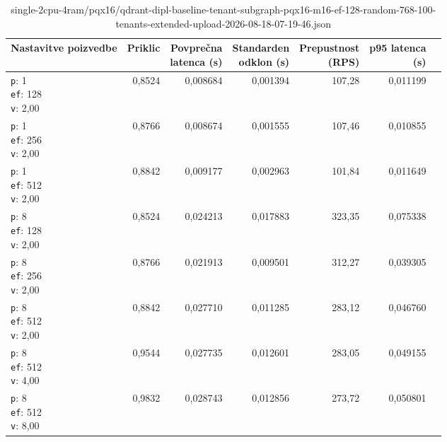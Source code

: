 \begin{table}[htbp]
  \centering
\small
  \caption{single-2cpu-4ram/pqx16/qdrant-dipl-baseline-tenant-subgraph-pqx16-m16-ef-128-random-768-100-tenants-extended-upload-2026-08-18-07-19-46.json}
  \label{tab:single-2cpu-4ram:pqx16:qdrant-dipl-baseline-tenant-subgraph-pqx16-m16-ef-128-random-768-100-tenants-extended-upload-2026-08-18-07-19-46.json}
  \begin{tabularx}{\textwidth}{Xrrrrrr}
    \toprule
    Nastavitve poizvedbe & Priklic & \makecell{Povprečna\\latenca (s)} & \makecell{Standarden\\odklon (s)} & \makecell{Prepustnost\\(RPS)} & \makecell{p95 latenca\\(s)}  \\
    \midrule
    \makecell{\texttt{p}: 1\\\texttt{ef}: 128\\\texttt{v}: 2,00} & 0,8524 & 0,008684 & 0,001394 & 107,28 & 0,011199 \\
    \makecell{\texttt{p}: 1\\\texttt{ef}: 256\\\texttt{v}: 2,00} & 0,8766 & 0,008674 & 0,001555 & 107,46 & 0,010855 \\
    \makecell{\texttt{p}: 1\\\texttt{ef}: 512\\\texttt{v}: 2,00} & 0,8842 & 0,009177 & 0,002963 & 101,84 & 0,011649 \\
    \makecell{\texttt{p}: 8\\\texttt{ef}: 128\\\texttt{v}: 2,00} & 0,8524 & 0,024213 & 0,017883 & 323,35 & 0,075338 \\
    \makecell{\texttt{p}: 8\\\texttt{ef}: 256\\\texttt{v}: 2,00} & 0,8766 & 0,021913 & 0,009501 & 312,27 & 0,039305 \\
    \makecell{\texttt{p}: 8\\\texttt{ef}: 512\\\texttt{v}: 2,00} & 0,8842 & 0,027710 & 0,011285 & 283,12 & 0,046760 \\
    \makecell{\texttt{p}: 8\\\texttt{ef}: 512\\\texttt{v}: 4,00} & 0,9544 & 0,027735 & 0,012601 & 283,05 & 0,049155 \\
    \makecell{\texttt{p}: 8\\\texttt{ef}: 512\\\texttt{v}: 8,00} & 0,9832 & 0,028743 & 0,012856 & 273,72 & 0,050801 \\

\end{tabularx}
\end{table}
